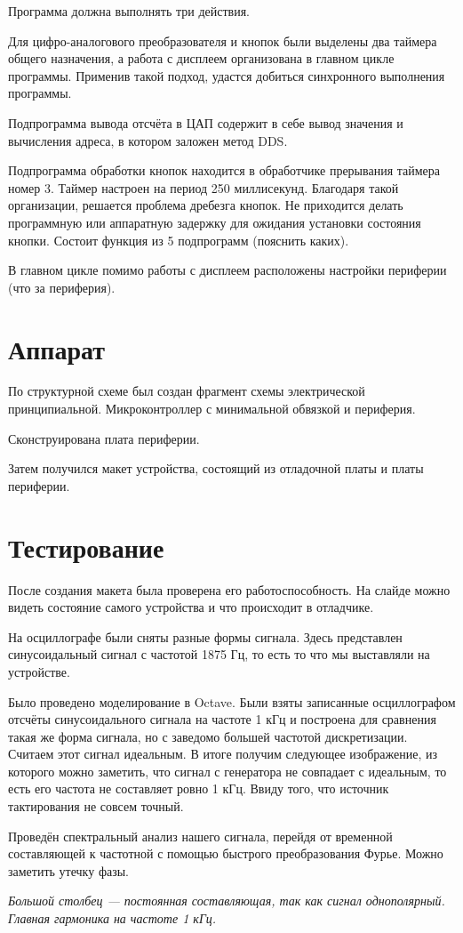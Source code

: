\documentclass[a4paper, 14pt]{extarticle}
\begin{document}
	Программа должна выполнять три действия.
	
	Для цифро-аналогового преобразователя и кнопок были выделены два таймера общего назначения, а работа с дисплеем организована в главном цикле программы. Применив такой подход, удастся добиться синхронного выполнения программы. 
	
	Подпрограмма вывода отсчёта в ЦАП содержит в себе вывод значения и вычисления адреса, в котором заложен метод DDS.
	
	Подпрограмма обработки кнопок находится в обработчике прерывания таймера номер 3. Таймер настроен на период 250 миллисекунд. Благодаря такой организации, решается проблема дребезга кнопок. Не приходится делать программную или аппаратную задержку для ожидания установки состояния кнопки. Состоит функция из 5 подпрограмм (пояснить каких).
	
	В главном цикле помимо работы с дисплеем расположены настройки периферии (что за периферия).
	
\section*{Аппарат}
	По структурной схеме был создан фрагмент схемы электрической принципиальной. Микроконтроллер с минимальной обвязкой и периферия.
	
	Сконструирована плата периферии. 
	 
	Затем получился макет устройства, состоящий из отладочной платы и платы периферии.
	
\section*{Тестирование}
	После создания макета была проверена его работоспособность. На слайде можно видеть состояние самого устройства и что происходит в отладчике.
	
	На осциллографе были сняты разные формы сигнала. Здесь представлен синусоидальный сигнал с частотой 1875 Гц, то есть то что мы выставляли на устройстве. 
	
	Было проведено моделирование в Octave. Были взяты записанные осциллографом отсчёты синусоидального сигнала на частоте 1 кГц и построена для сравнения такая же форма сигнала, но с заведомо большей частотой дискретизации. Считаем этот сигнал идеальным. В итоге получим следующее изображение, из которого можно заметить, что сигнал с генератора не совпадает с идеальным, то есть его частота не составляет ровно 1 кГц. Ввиду того, что источник тактирования не совсем точный.
	
	Проведён спектральный анализ нашего сигнала, перейдя от временной составляющей к частотной с помощью быстрого преобразования Фурье. Можно заметить утечку фазы.
	
	\textit{Большой столбец --- постоянная составляющая, так как сигнал однополярный. Главная гармоника на частоте 1 кГц.}
\end{document}
